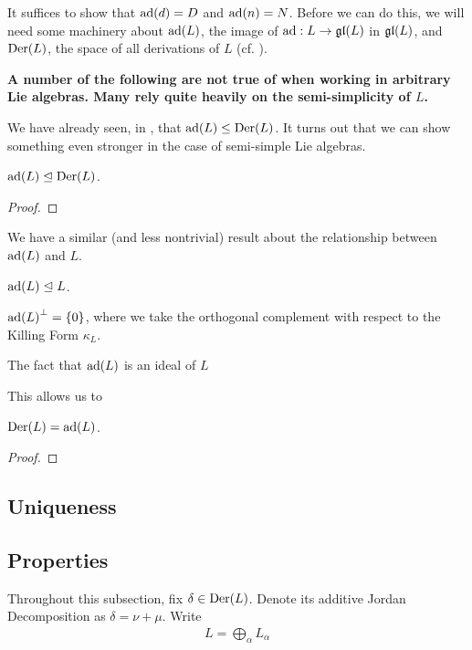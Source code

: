 It suffices to show that $\operatorname{ad}\!\left( d \right) = D$ and $\operatorname{ad}\!\left( n \right) = N$. Before we can do this, we will need some machinery about $\operatorname{ad}\!\left( L \right)$, the image of $\operatorname{ad} : L \to \mathfrak{gl}\!\left( L \right)$ in $\mathfrak{gl}\!\left( L \right)$, and $\operatorname{Der}\!\left( L \right)$, the space of all derivations of $L$ (cf. ).

\textbf{A number of the following are not true of when working in arbitrary Lie algebras. Many rely quite heavily on the semi-simplicity of $L$.}

We have already seen, in , that $\operatorname{ad}\!\left( L \right) \leq \operatorname{Der}\!\left( L \right)$. It turns out that we can show something even stronger in the case of semi-simple Lie algebras.

\begin{boxlemma}
    $\operatorname{ad}\!\left( L \right) \trianglelefteq \operatorname{Der}\!\left( L \right)$.
\end{boxlemma}
\begin{proof}
    
    \sorry
\end{proof}

We have a similar (and less nontrivial) result about the relationship between $\operatorname{ad}\!\left( L \right)$ and $L$.

\begin{boxlemma}
    $\operatorname{ad}\!\left( L \right) \trianglelefteq L$.
\end{boxlemma}

\begin{boxlemma}
    $\operatorname{ad}\!\left( L \right)^{\perp} = \left\{ 0 \right\}$, where we take the orthogonal complement with respect to the Killing Form $\kappa_{L}$.
\end{boxlemma}

The fact that $\operatorname{ad}\!\left( L \right)$ is an ideal of $L$ 

This allows us to 

\begin{boxproposition}
    $\operatorname{Der}\!\left( L \right) = \operatorname{ad}\!\left( L \right)$.
\end{boxproposition}
\begin{proof}
    
\end{proof}

\subsection{Uniqueness}

\subsection{Properties}

Throughout this subsection, fix $\delta \in \operatorname{Der}\!\left( L \right)$. Denote its additive Jordan Decomposition as $\delta = \nu + \mu$. Write
\begin{align*}
    L = \bigoplus_{\alpha} L_{\alpha}  %
\end{align*}

